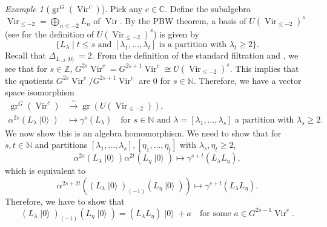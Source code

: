 \documentclass[a4paper, 12pt, reqno]{amsart}
\theoremstyle{remark}
\newtheorem{example}[theorem]{Example}
\numberwithin{equation}{subsection}
\DeclareMathOperator{\Vir}{Vir}
\DeclareMathOperator{\gr}{gr}
\DeclareMathOperator{\vac}{|0\rangle}
\begin{document}
\begin{example}[$\gr^G(\Vir^c)$]
  \label{exa:12}
  Pick any $c \in \mathbb{C}$.
  Define the subalgebra $\Vir_{\le -2} = \bigoplus_{n \le -2}L_{n}$ of $\Vir$.
  By the PBW theorem, a basis of $U(\Vir_{\le -2})^s$ (see  for the definition of $U(\Vir_{\le -2})^s$) is given by
  \begin{equation*}
    \{L_{\lambda} \mid t \le s\text{ and }[\lambda_1, \dots, \lambda_t]\text{ is a partition with }\lambda_t \ge 2\}.
  \end{equation*}
  Recall that $\Delta_{L_{-2}\vac} = 2$.
  From the definition of the standard filtration and , we see that for $s \in \mathbb{Z}$, $G^{2s}\Vir^c = G^{2s + 1}\Vir^c \cong U(\Vir_{\le -2})^s$.
  This implies that the quotients $G^{2s}\Vir^c/G^{2s + 1}\Vir^c$ are $0$ for $s \in \mathbb{N}$.
  Therefore, we have a vector space isomorphism
  \begin{align*}
    \gr^G(\Vir^c) &\xrightarrow{\sim} \gr(U(\Vir_{\le -2})), \\
    \alpha^{2s}(L_{\lambda}\vac) &\mapsto \gamma^s(L_{\lambda}) \quad \text{for }s \in \mathbb{N}\text{ and }\lambda = [\lambda_1, \dots, \lambda_s]\text{ a partition with }\lambda_s \ge 2.
  \end{align*}
  We now show this is an algebra homomorphism.
  We need to show that for $s, t \in \mathbb{N}$ and partitions $[\lambda_1, \dots, \lambda_s], [\eta_1, \dots, \eta_t]$ with $\lambda_s, \eta_t \ge 2$,
  \begin{equation*}
    \alpha^{2s}(L_{\lambda}\vac)\alpha^{2t}(L_{\eta}\vac) \mapsto \gamma^{s + t}(L_{\lambda}L_{\eta}),
  \end{equation*}
  which is equivalent to
  \begin{equation*}
    \alpha^{2s + 2t}((L_{\lambda}\vac)_{(-1)}(L_{\eta}\vac)) \mapsto \gamma^{s + t}(L_{\lambda}L_{\eta}).
  \end{equation*}
  Therefore, we have to show that
  \begin{equation}
    \label{eq:34}
    (L_{\lambda}\vac)_{(-1)}(L_{\eta}\vac) = (L_{\lambda}L_{\eta})\vac + a \quad \text{for some }a \in G^{2s - 1}\Vir^c.
  \end{equation}


\end{example}
\end{document}

